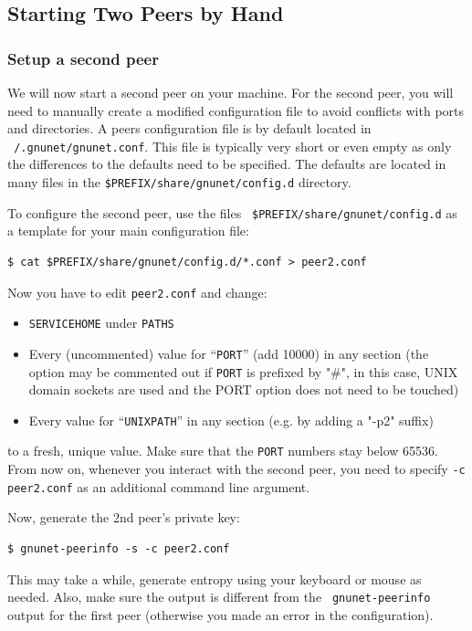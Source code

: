 \documentclass[10pt]{article}
\begin{document}
\subsection{Starting Two Peers by Hand}

\subsubsection{Setup a second peer}
We will now start a second peer on your machine.
For the second peer, you will need to manually create a modified
configuration file to avoid conflicts with ports and directories.
A peers configuration file is by default located in {\tt ~/.gnunet/gnunet.conf}.
This file is typically very short or even empty as only the differences to the
defaults need to be specified.  The defaults are located in
many files in the {\tt \$PREFIX/share/gnunet/config.d} directory.

To configure the second peer, use the files {\tt
  \$PREFIX/share/gnunet/config.d} as a template for your main
configuration file:
%
\lstset{language=bash}
\lstset{language=bash}
\begin{lstlisting}
$ cat $PREFIX/share/gnunet/config.d/*.conf > peer2.conf
\end{lstlisting}
Now you have to edit {\tt peer2.conf} and change:
\begin{itemize}
  \itemsep0em
  \item{\texttt{SERVICEHOME} under \texttt{PATHS}}
  \item{Every (uncommented) value for ``\texttt{PORT}'' (add 10000) in any
        section (the option may be commented out if \texttt{PORT} is
        prefixed by "\#", in this case, UNIX domain sockets are used
        and the PORT option does not need to be touched) }
  \item{Every value for ``\texttt{UNIXPATH}'' in any section (e.g. by adding a "-p2" suffix)}
\end{itemize}
to a fresh, unique value.  Make sure that the \texttt{PORT} numbers stay
below 65536.  From now on, whenever you interact with the second
peer, you need to specify {\tt -c peer2.conf} as an additional
command line argument.

Now, generate the 2nd peer's private key:

\lstset{language=bash}
\begin{lstlisting}
$ gnunet-peerinfo -s -c peer2.conf
\end{lstlisting}

This may take a while, generate entropy using your keyboard or mouse
as needed.  Also, make sure the output is different from the {\tt
  gnunet-peerinfo} output for the first peer (otherwise you made an
error in the configuration).
\end{document}
